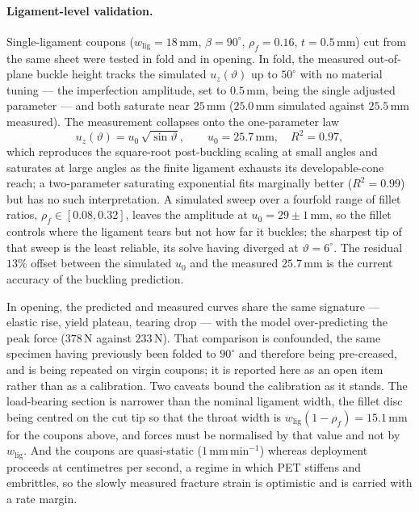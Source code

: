 \documentclass[pdflatex,sn-mathphys-num]{sn-jnl}%
\theoremstyle{thmstyleone}%
\theoremstyle{thmstyletwo}%
\theoremstyle{thmstylethree}%
\newcommand{\wlig}{w_{\mathrm{lig}}}
\begin{document}
\paragraph{Ligament-level validation.}
Single-ligament coupons ($\wlig=18\,\mathrm{mm}$, $\beta=90^\circ$,
$\rho_f=0.16$, $t=0.5\,\mathrm{mm}$) cut from the same sheet were tested in fold
and in opening. In fold, the measured out-of-plane buckle height tracks the
simulated $u_z(\vartheta)$ up to $50^\circ$ with no material tuning --- the
imperfection amplitude, set to $0.5\,\mathrm{mm}$, being the single adjusted
parameter --- and both saturate near $25\,\mathrm{mm}$ ($25.0\,\mathrm{mm}$
simulated against $25.5\,\mathrm{mm}$ measured). The measurement collapses onto
the one-parameter law
\begin{equation}
  u_z(\vartheta) = u_0\,\sqrt{\sin\vartheta},
  \qquad u_0 = 25.7\,\mathrm{mm},\quad R^2=0.97 ,
  \label{eq:buckle-law}
\end{equation}
which reproduces the square-root post-buckling scaling at small angles and
saturates at large angles as the finite ligament exhausts its developable-cone
reach; a two-parameter saturating exponential fits marginally better
($R^2=0.99$) but has no such interpretation. A simulated sweep over a fourfold
range of fillet ratios, $\rho_f\in[0.08,0.32]$, leaves the amplitude at
$u_0=29\pm1\,\mathrm{mm}$, so the fillet controls where the ligament tears but not
how far it buckles; the sharpest tip of that sweep is the least reliable, its
solve having diverged at $\vartheta=6^\circ$. The residual $13\%$ offset between
the simulated $u_0$ and the measured $25.7\,\mathrm{mm}$ is the current accuracy
of the buckling prediction.

In opening, the predicted and measured curves share the same signature --- elastic
rise, yield plateau, tearing drop --- with the model over-predicting the peak
force ($378\,\mathrm{N}$ against $233\,\mathrm{N}$). That comparison is
confounded, the same specimen having previously been folded to $90^\circ$ and
therefore being pre-creased, and is being repeated on virgin coupons; it is
reported here as an open item rather than as a calibration. Two caveats bound the
calibration as it stands. The load-bearing section is narrower than the nominal
ligament width, the fillet disc being centred on the cut tip so that the throat
width is $\wlig(1-\rho_f)=15.1\,\mathrm{mm}$ for the coupons above, and forces
must be normalised by that value and not by $\wlig$. And the coupons are
quasi-static ($1\,\mathrm{mm\,min^{-1}}$) whereas deployment proceeds at
centimetres per second, a regime in which PET stiffens and embrittles, so the
slowly measured fracture strain is optimistic and is carried with a rate margin.
\end{document}
